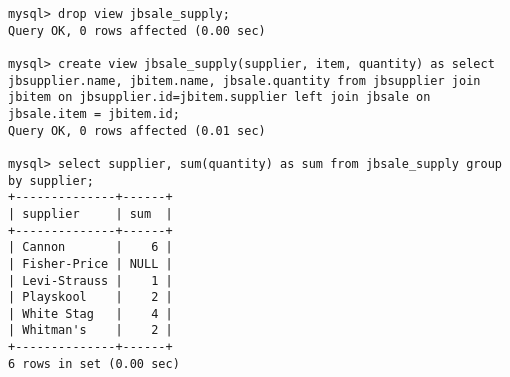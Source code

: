 \documentclass{article}
\begin{document}
\begin{lstlisting}
mysql> drop view jbsale_supply;
Query OK, 0 rows affected (0.00 sec)

mysql> create view jbsale_supply(supplier, item, quantity) as select jbsupplier.name, jbitem.name, jbsale.quantity from jbsupplier join jbitem on jbsupplier.id=jbitem.supplier left join jbsale on jbsale.item = jbitem.id;
Query OK, 0 rows affected (0.01 sec)

mysql> select supplier, sum(quantity) as sum from jbsale_supply group by supplier;
+--------------+------+
| supplier     | sum  |
+--------------+------+
| Cannon       |    6 |
| Fisher-Price | NULL |
| Levi-Strauss |    1 |
| Playskool    |    2 |
| White Stag   |    4 |
| Whitman's    |    2 |
+--------------+------+
6 rows in set (0.00 sec)
\end{lstlisting}
\end{document}
